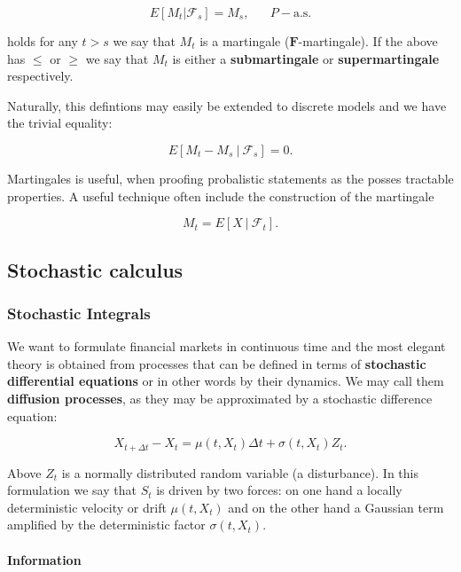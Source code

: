 \documentclass[
]{article}
\begin{document}
\[E[M_t\vert \mathcal{F}_s]=M_s,\hspace{20pt}P-\text{a.s.}\]

holds for any \(t>s\) we say that \(M_t\) is a martingale
(\(\mathbf{F}\)-martingale). If the above has \(\le\) or \(\ge\) we say
that \(M_t\) is either a \textbf{submartingale} or
\textbf{supermartingale} respectively.

Naturally, this defintions may easily be extended to discrete models and
we have the trivial equality:

\[E[M_t-M_s\ \vert\ \mathcal{F}_s]=0.\]

Martingales is useful, when proofing probalistic statements as the
posses tractable properties. A useful technique often include the
construction of the martingale

\[M_t=E[X\ \vert\ \mathcal{F}_t].\]

\hypertarget{stochastic-calculus}{%
\subsection{Stochastic calculus}\label{stochastic-calculus}}

\hypertarget{stochastic-integrals}{%
\subsubsection{Stochastic Integrals}\label{stochastic-integrals}}

We want to formulate financial markets in continuous time and the most
elegant theory is obtained from processes that can be defined in terms
of \textbf{stochastic differential equations} or in other words by their
dynamics. We may call them \textbf{diffusion processes}, as they may be
approximated by a stochastic difference equation:

\[
X_{t+\Delta t}-X_t=\mu(t,X_t)\Delta t+\sigma(t,X_t)Z_t.\tag{4.1}
\]

Above \(Z_t\) is a normally distributed random variable (a disturbance).
In this formulation we say that \(S_t\) is driven by two forces: on one
hand a locally deterministic velocity or drift \(\mu(t,X_t)\) and on the
other hand a Gaussian term amplified by the deterministic factor
\(\sigma(t,X_t)\).

\hypertarget{information}{%
\paragraph{Information}\label{information}}
\end{document}
